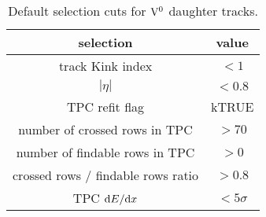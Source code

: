 \begin{table}[htdp]
\begin{center}
\begin{tabular}{|c|c|}
\hline
selection                           & value \\
\hline
track Kink index                    & $<1$ \\
$|\eta|$                            & $<0.8$ \\
TPC refit flag                      & kTRUE \\
number of crossed rows in TPC       & $>70$ \\
number of findable rows in TPC      & $>0$ \\
crossed rows / findable rows ratio  & $>0.8$ \\
TPC ${\rm d}E/{\rm d}x$             & $<5\sigma$ \\
\hline
\end{tabular}
\end{center}
\caption{Default selection cuts for ${\rm V}^{0}$ daughter tracks.}
\label{tab:c03ValSelV0DauTrk}
\end{table}

